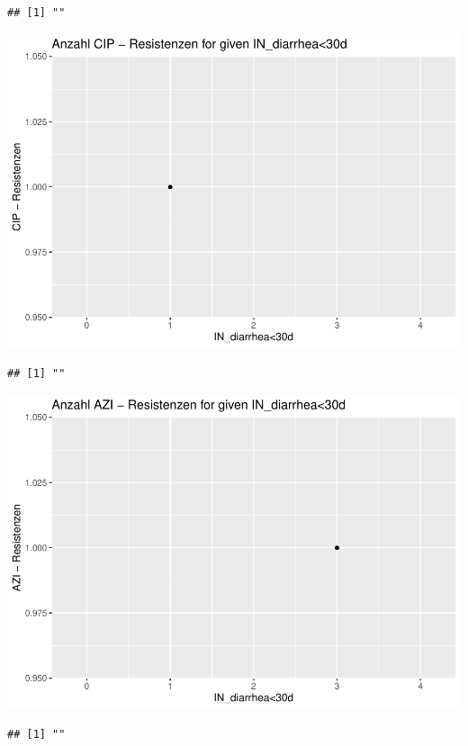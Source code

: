 \documentclass[
]{article}
\begin{document}
\begin{verbatim}
## [1] ""
\end{verbatim}

\includegraphics{NResistenzen_files/figure-latex/numerical_variables-32.pdf}

\begin{verbatim}
## [1] ""
\end{verbatim}

\includegraphics{NResistenzen_files/figure-latex/numerical_variables-33.pdf}

\begin{verbatim}
## [1] ""
\end{verbatim}
\end{document}
